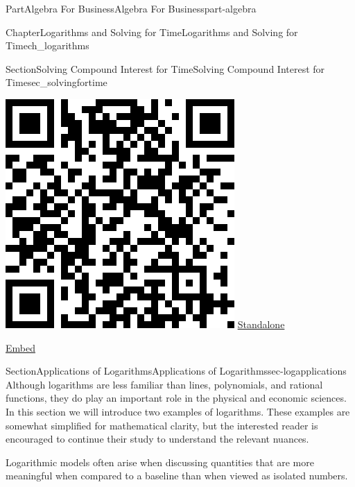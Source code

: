 \documentclass{tufte-book}
\numberwithin{equation}{chapter}
\begin{document}
\begin{partptx}{Part}{Algebra For Business}{}{Algebra For Business}{}{}{part-algebra}
\begin{chapterptx}{Chapter}{Logarithms and Solving for Time}{}{Logarithms and Solving for Time}{}{}{ch_logarithms}
\begin{sectionptx}{Section}{Solving Compound Interest for Time}{}{Solving Compound Interest for Time}{}{}{sec_solvingfortime}
\begin{sidebyside}{2}{0.075}{0.075}{0.17}
\begin{sbspanel}{0.21}
\includegraphics[width=\linewidth]{generated/qrcode/interactive_depreciation.png}
\href{http://webwork.bridgew.edu/oer/functions_at_work/interactive_depreciation.html}{Standalone}%
\par
\href{http://webwork.bridgew.edu/oer/functions_at_work/interactive_depreciation-if.html}{Embed}%
\end{sbspanel}%
\end{sidebyside}%
\end{sectionptx}
%
%
\typeout{************************************************}
\typeout{************************************************}
%
\begin{sectionptx}{Section}{Applications of Logarithms}{}{Applications of Logarithms}{}{}{sec-logapplications}
Although logarithms are less familiar than lines, polynomials, and rational functions, they do play an important role in the physical and economic sciences.  In this section we will introduce two examples of logarithms. These examples are somewhat simplified for mathematical clarity, but the interested reader is encouraged to continue their study to understand the relevant nuances.%
\par
Logarithmic models often arise when discussing quantities that are more meaningful when compared to a baseline than when viewed as isolated numbers.%

\end{sectionptx}
\end{chapterptx}
\end{partptx}
\end{document}
